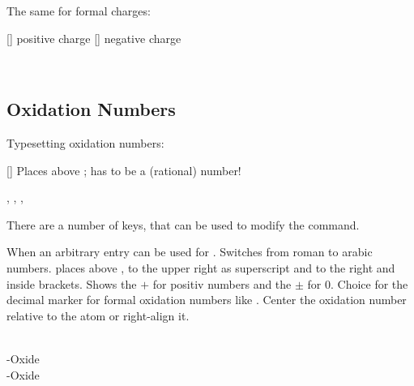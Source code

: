 \documentclass[load-preamble+]{cnltx-doc}
\begin{document}
The same for formal charges:
\begin{commands}
  []
    positive charge
  []
    negative charge
\end{commands}

\begin{example}
  \leavevmode
  \fpch\ \fmch\ \fpch[3] \fmch[3]
\end{example}

\subsection{Oxidation Numbers}\label{ssec:oxidationszahlen}

Typesetting oxidation numbers:
\begin{commands}
  []
    Places  above ;  has to be a
    (rational) number!
\end{commands}

\begin{example}
  , , , 
\end{example}

There are a number of keys, that can be used to modify the  command.
\begin{options}
    When  an arbitrary entry can be used for .
    Switches from roman to arabic numbers.
     places  above ,  to the
    upper right as superscript and  to the right and inside
    brackets.
    Shows the $+$ for positiv numbers and the $\pm$ for $0$.
    Choice for the decimal marker for formal oxidation numbers like .
    Center the oxidation number relative to the atom or right-align it.
\end{options}

\begin{example}
    \\
  -Oxide \\
  -Oxide \\
   \\
\end{example}
\end{document}
